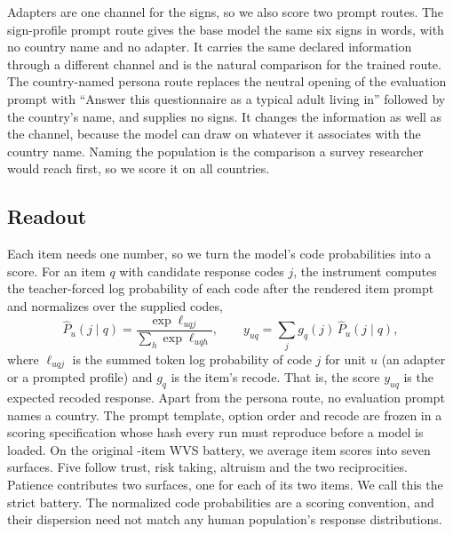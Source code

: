 Adapters are one channel for the signs, so we also score two prompt routes. The sign-profile prompt route gives the base model the same six signs in words, with no country name and no adapter. It carries the same declared information through a different channel and is the natural comparison for the trained route. The country-named persona route replaces the neutral opening of the evaluation prompt with ``Answer this questionnaire as a typical adult living in'' followed by the country's name, and supplies no signs. It changes the information as well as the channel, because the model can draw on whatever it associates with the country name. Naming the population is the comparison a survey researcher would reach first, so we score it on all  countries.

\subsection{Readout}

Each item needs one number, so we turn the model's code probabilities into a score. For an item $q$ with candidate response codes $j$, the instrument computes the teacher-forced log probability of each code after the rendered item prompt and normalizes over the supplied codes,
\begin{equation}
\widehat P_u(j\mid q)=\frac{\exp \ell_{uqj}}{\sum_h \exp \ell_{uqh}},
\qquad
y_{uq}=\sum_j g_q(j)\,\widehat P_u(j\mid q),
\label{eq:readout}
\end{equation}
where $\ell_{uqj}$ is the summed token log probability of code $j$ for unit $u$ (an adapter or a prompted profile) and $g_q$ is the item's recode. That is, the score $y_{uq}$ is the expected recoded response. Apart from the persona route, no evaluation prompt names a country. The prompt template, option order and recode are frozen in a scoring specification whose hash every run must reproduce before a model is loaded. On the original -item WVS battery, we average item scores into seven surfaces. Five follow trust, risk taking, altruism and the two reciprocities. Patience contributes two surfaces, one for each of its two items. We call this the strict battery. The normalized code probabilities are a scoring convention, and their dispersion need not match any human population's response distributions.
